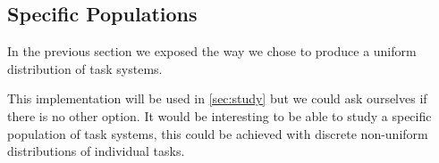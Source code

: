 \subsection{Specific Populations}

In the previous section we exposed the way we chose to produce a uniform distribution of task systems.

This implementation will be used in \ref{sec:study} but we could ask ourselves if there is no other option.
It would be interesting to be able to study a specific population of task systems, this could be achieved with discrete non-uniform distributions of individual tasks.
